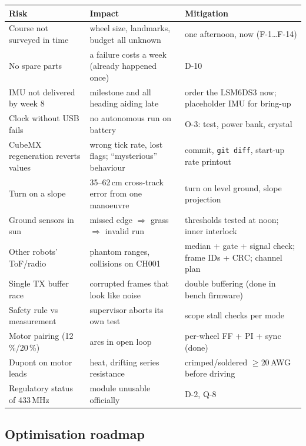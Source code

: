 \documentclass[11pt,a4paper]{article}
\newcommand{\code}[1]{\texttt{\small #1}}
\begin{document}
\begin{center}
\small
\begin{tabularx}{\textwidth}{@{}LLL@{}}
\toprule
\textbf{Risk} & \textbf{Impact} & \textbf{Mitigation}\\
\midrule
Course not surveyed in time & wheel size, landmarks, budget all unknown & one afternoon, now (F-1\ldots F-14)\\
No spare parts & a failure costs a week (already happened once) & D-10\\
IMU not delivered by week 8 & milestone and all heading aiding late & order the LSM6DS3 now; placeholder IMU for bring-up\\
Clock without USB fails & no autonomous run on battery & O-3: test, power bank, crystal\\
CubeMX regeneration reverts values & wrong tick rate, lost flags; ``mysterious'' behaviour & commit, \code{git diff}, start-up rate printout\\
Turn on a slope & 35--62\,cm cross-track error from one manoeuvre & turn on level ground, slope projection\\
Ground sensors in sun & missed edge $\Rightarrow$ grass $\Rightarrow$ invalid run & thresholds tested at noon; inner interlock\\
Other robots' ToF/radio & phantom ranges, collisions on CH001 & median + gate + signal check; frame IDs + CRC; channel plan\\
Single TX buffer race & corrupted frames that look like noise & double buffering (done in bench firmware)\\
Safety rule vs measurement & supervisor aborts its own test & scope stall checks per mode\\
Motor pairing (12\,\%/20\,\%) & arcs in open loop & per-wheel FF + PI + sync (done)\\
Dupont on motor leads & heat, drifting series resistance & crimped/soldered $\ge$20\,AWG before driving\\
Regulatory status of 433\,MHz & module unusable officially & D-2, Q-8\\
\bottomrule
\end{tabularx}
\end{center}

\subsection{Optimisation roadmap}\label{sec:opt}
\end{document}
